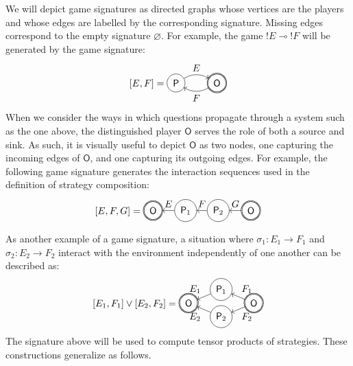 \documentclass[sigplan,screen]{acmart}
\newcommand{\kw}[1]{\ensuremath{ \mathsf{#1} }}
\begin{document}
We will depict game signatures as directed graphs
whose vertices are the players and
whose edges are labelled by the corresponding signature.
Missing edges correspond to the empty signature $\varnothing$.
For example,
the game ${!E} \multimap {!F}$ will be generated by
the game signature:
\[
  [E,F] =
  \begin{tikzpicture}[baseline=(O.base),scale=1.5]
    \node[circle,draw,double] (O) at (0,0) {$\kw{O}$};
    \node[circle,draw] (P) at (-1,0) {$\kw{P}$};
    \path[->] (P) edge[bend left] node[above] {$E$} (O);
    \path[->] (O) edge[bend left] node[below] {$F$} (P);
  \end{tikzpicture}
\]
When we consider the ways in which questions propagate
through a system such as the one above,
the distinguished player $\kw{O}$ serves the role
of both a source and sink.
As such, it is visually useful
to depict $\kw{O}$ as two nodes,
one capturing the incoming edges of $\kw{O}$, and
one capturing its outgoing edges.
For example,
the following game signature
generates the interaction sequences
used in the definition of
strategy composition:
\[
  [E,F,G] =
  \begin{tikzpicture}[baseline=(O1.base),scale=1.2]
    \node[circle,double,draw] (O1) at (0,0) {$\kw{O}$};
    \node[circle,draw] (P1) at (-1,0) {$\kw{P}_2$};
    \node[circle,draw] (P2) at (-2,0) {$\kw{P}_1$};
    \node[circle,double,draw] (O2) at (-3,0) {$\kw{O}$};
    \path[->] (O1) edge node[above] {$G$} (P1);
    \path[->] (P1) edge node[above] {$F$} (P2);
    \path[->] (P2) edge node[above] {$E$} (O2);
  \end{tikzpicture}
\]

As another example of a game signature,
a situation where
$\sigma_1 : E_1 \rightarrow F_1$ and
$\sigma_2 : E_2 \rightarrow F_2$
interact with the environment
independently of one another
can be described as:
\[
  [E_1,F_1] \vee [E_2,F_2] =
  \begin{tikzpicture}[baseline=(O.base),xscale=1.2]
    \node[circle,draw,double] (O1) at (+1,0) {$\kw{O}$};
    \node[circle,draw,double] (O2) at (-1,0) {$\kw{O}$};
    \node[circle,draw] (P1) at (0,+0.5) {$\kw{P}_1$};
    \node[circle,draw] (P2) at (0,-0.5) {$\kw{P}_2$};
    \path[->] (O1) edge node[auto=right] {$F_1$} (P1);
    \path[->] (P1) edge node[auto=right] {$E_1$} (O2);
    \path[->] (O1) edge node[auto=left] {$F_2$} (P2);
    \path[->] (P2) edge node[auto=left] {$E_2$} (O2);
  \end{tikzpicture}
\]
The signature above will be used to compute
tensor products of strategies.
These constructions generalize as follows.
\end{document}
